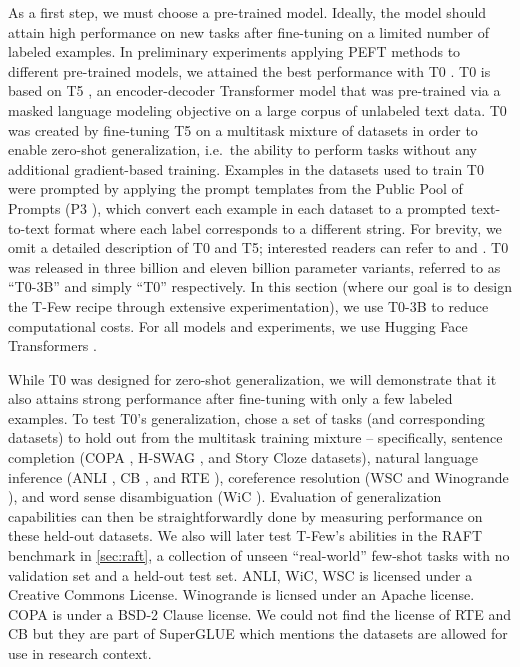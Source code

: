 As a first step, we must choose a pre-trained model. Ideally, the model should attain high performance on new tasks after fine-tuning on a limited number of labeled examples. In preliminary experiments applying PEFT methods to different pre-trained models, we attained the best performance with T0 \cite{sanh2021multitask}. T0 is based on T5 \citep{raffel2019exploring}, an encoder-decoder Transformer model \citep{vaswani2017attention} that was pre-trained via a masked language modeling objective \citep{devlin2018bert} on a large corpus of unlabeled text data. T0 was created by fine-tuning T5 on a multitask mixture of datasets in order to enable zero-shot generalization, i.e.\ the ability to perform tasks without any additional gradient-based training. Examples in the datasets used to train T0 were prompted by applying the prompt templates from the Public Pool of Prompts (P3 \citep{bach2022promptsource}), which convert each example in each dataset to a prompted text-to-text format where each label corresponds to a different string. For brevity, we omit a detailed description of T0 and T5; interested readers can refer to \citet{sanh2021multitask} and \citet{raffel2019exploring}.
T0 was released in three billion and eleven billion parameter variants, referred to as ``T0-3B'' and simply ``T0'' respectively. In this section (where our goal is to design the {\selectfont T-Few} recipe through extensive experimentation), we use T0-3B to reduce computational costs. For all models and experiments, we use Hugging Face Transformers \citep{wolf2020transformers}.

While T0 was designed for zero-shot generalization, we will demonstrate that it also attains strong performance after fine-tuning with only a few labeled examples. To test T0's generalization, \citet{sanh2021multitask} chose a set of tasks (and corresponding datasets) to hold out from the multitask training mixture -- specifically, sentence completion (COPA \citep{copa}, H-SWAG \citep{zellers2019hellaswag}, and Story Cloze \citep{sharma2018tackling} datasets), natural language inference (ANLI \citep{nie2019adversarial}, CB \citep{cb}, and RTE \citep{dagan2005pascal}), coreference resolution (WSC \citep{wsc} and Winogrande \citep{sakaguchi2020winogrande}), and word sense disambiguation (WiC \citep{pilehvar2018wic}). Evaluation of generalization capabilities can then be straightforwardly done by measuring performance on these held-out datasets. We also will later test {\selectfont T-Few}'s abilities in the RAFT benchmark \citep{alex2021raft} in \ref{sec:raft}, a collection of unseen ``real-world'' few-shot tasks with no validation set and a held-out test set. ANLI, WiC, WSC is licensed under a Creative Commons License. Winogrande is licnsed under an Apache license.  COPA is under a BSD-2 Clause license. We could not find the license of RTE and CB but they are part of SuperGLUE which mentions the datasets are allowed for use in research context.


